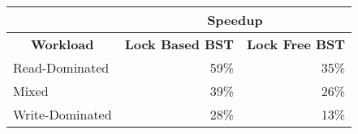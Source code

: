 \begin{table}[h]
\begin{tabular}{|l|r|r|}
\hline
                                        & \multicolumn{2}{c|}{\textbf{Speedup}}                                                  \\ \hline
\multicolumn{1}{|c|}{\textbf{Workload}} & \multicolumn{1}{c|}{\textbf{Lock Based BST}} & \multicolumn{1}{c|}{\textbf{Lock Free BST}} \\ \hline
Read-Dominated                          & 59\%                                      & 35\%                                      \\ \hline
Mixed                                   & 39\%                                       & 26\%                                      \\ \hline
Write-Dominated                         & 28\%                                       & 13\%                                      \\ \hline
\end{tabular}
\end{table}